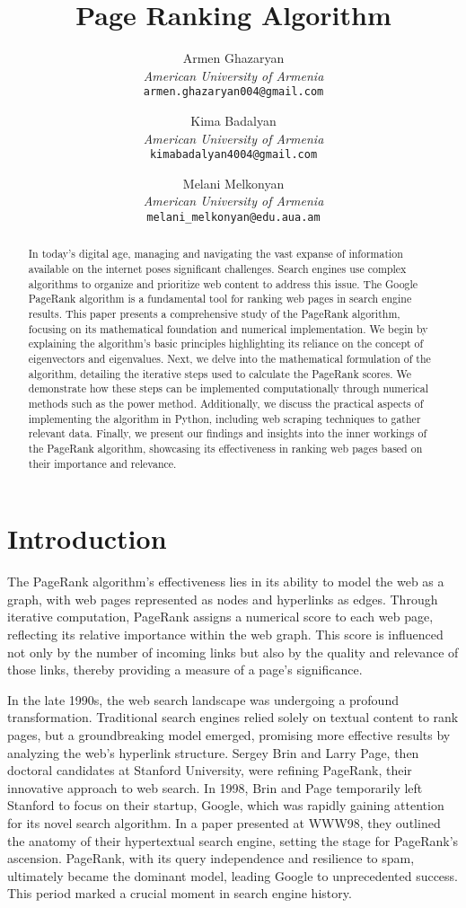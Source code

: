 \documentclass{article}
\title{Page Ranking Algorithm}
\author{
    Armen Ghazaryan \\
    \textit{American University of Armenia} \\
    \texttt{armen.ghazaryan004@gmail.com}
    \and
    Kima Badalyan \\
    \textit{American University of Armenia} \\
    \texttt{kimabadalyan4004@gmail.com}
    \and
    Melani Melkonyan \\
    \textit{American University of Armenia} \\
    \texttt{melani\_melkonyan@edu.aua.am}
}
\date{} %
\begin{document}
\maketitle

\begin{abstract}
In today's digital age, managing and navigating the vast expanse of information available on the internet poses significant challenges. Search engines use complex algorithms to organize and prioritize web content to address this issue. The Google PageRank algorithm is a fundamental tool for ranking web pages in search engine results. This paper presents a comprehensive study of the PageRank algorithm, focusing on its mathematical foundation and numerical implementation. We begin by explaining the algorithm's basic principles highlighting its reliance on the concept of eigenvectors and eigenvalues. Next, we delve into the mathematical formulation of the algorithm, detailing the iterative steps used to calculate the PageRank scores. We demonstrate how these steps can be implemented computationally through numerical methods such as the power method. Additionally, we discuss the practical aspects of implementing the algorithm in Python, including web scraping techniques to gather relevant data. Finally, we present our findings and insights into the inner workings of the PageRank algorithm, showcasing its effectiveness in ranking web pages based on their importance and relevance.
\end{abstract}

\section{Introduction}
The PageRank algorithm's effectiveness lies in its ability to model the web as a graph, with web pages represented as nodes and hyperlinks as edges. Through iterative computation, PageRank assigns a numerical score to each web page, reflecting its relative importance within the web graph. This score is influenced not only by the number of incoming links but also by the quality and relevance of those links, thereby providing a measure of a page's significance.

In the late 1990s, the web search landscape was undergoing a profound transformation. Traditional search engines relied solely on textual content to rank pages, but a groundbreaking model emerged, promising more effective results by analyzing the web's hyperlink structure. Sergey Brin and Larry Page, then doctoral candidates at Stanford University, were refining PageRank, their innovative approach to web search. In 1998, Brin and Page temporarily left Stanford to focus on their startup, Google, which was rapidly gaining attention for its novel search algorithm. In a paper presented at WWW98, they outlined the anatomy of their hypertextual search engine, setting the stage for PageRank's ascension. PageRank, with its query independence and resilience to spam, ultimately became the dominant model, leading Google to unprecedented success. This period marked a crucial moment in search engine history.
\end{document}
